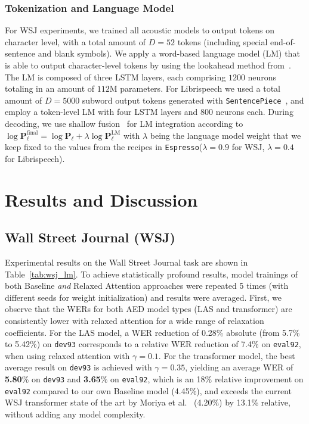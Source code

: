 \documentclass{article}
\newcommand{\VEC}[1]{\mathbf{#1}}          \newcommand{\VECG}[1]{\boldmath{#1}}     \newcommand{\MAT}[1]{\mathbf{#1}}          \newcommand{\MATG}[1]{\boldsymbol{#1}}
\def\espresso{\texttt{Espresso}\xspace}
\def\sentencepiece{\texttt{SentencePiece}\xspace}
\begin{document}
\subsubsection{Tokenization and Language Model}	\vspace{-2mm}
For \textrm{WSJ} experiments, we trained all acoustic models to output tokens on character level, with a total amount of $D\!=\!52$ tokens (including special end-of-sentence and blank symbols). We apply a word-based language model (LM) that is able to output character-level tokens by using the lookahead method from~\cite{hori2018}. The LM is composed of three LSTM layers, each comprising $1200$ neurons totaling in an amount of $112$M parameters. 
For Librispeech we used a total amount of $D\!=\!5000$ subword output tokens generated with \sentencepiece~\cite{Kudo2018}, and employ a token-level LM with four LSTM layers and $800$ neurons each. During decoding, we use shallow fusion~\cite{gulcehre2015,Toshniwal2018} for LM integration according to $\log\VEC{P}_\ell^{\mathrm{final}}\!=\! \log\VEC{P}_\ell  + \lambda\log\VEC{P}_\ell^{\mathrm{LM}}$ with $\lambda$ being the language model weight that we keep fixed to the values from the recipes in \espresso ($\lambda\!=\!0.9$ for WSJ, $\lambda\!=\!0.4$ for Librispeech).

\section{Results and Discussion}\vspace{-3mm}
\subsection{Wall Street Journal (WSJ)}\vspace{-2mm}
Experimental results on the Wall Street Journal task are shown in Table~\ref{tab:wsj_lm}. To achieve statistically profound results, model trainings of both \textsf{Baseline} \textit{and} \textsf{Relaxed Attention} approaches were repeated 5 times (with different seeds for weight initialization) and results were averaged. First, we observe that the WERs for both AED model types (LAS and transformer) are consistently lower with relaxed attention for a wide range of relaxation coefficients. For the LAS model, a WER reduction of 0.28\% absolute (from 5.7\% to 5.42\%) on \texttt{dev93} corresponds to a relative WER reduction of 7.4\% on \texttt{eval92}, when using relaxed attention with $\gamma\!=\!0.1$. For the transformer model, the best average result on \texttt{dev93} is achieved with $\gamma\!=\!0.35$, yielding an average WER of \textbf{5.80}\% on \texttt{dev93} and \textbf{3.65}\% on \texttt{eval92}, which is an 18\% relative improvement on \texttt{eval92} compared to our own \textsf{Baseline} model (4.45\%), and exceeds the current WSJ transformer state of the art by Moriya et al.~\cite{moriya2020} (4.20\%) by 13.1\% relative, without adding any model complexity. 
\end{document}
